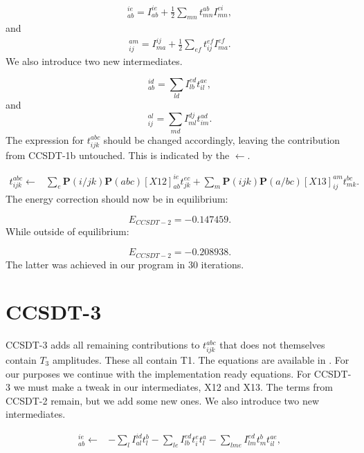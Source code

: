 \begin{align}
[X1]_{ab}^{ie} = I_{ab}^{ie} +
\frac{1}{2} \sum_{mn} t_{mn}^{ab} I_{mn}^{ei} ,
\end{align}
and
\begin{align}
[X2]_{ij}^{am} = I_{ma}^{ij} + \frac{1}{2} \sum_{ef} t_{ij}^{ef} I_{ma}^{ef}  .
\end{align}
We also introduce two new intermediates.

\begin{equation}
[X12]_{ab}^{id} = \sum_{ld} I_{lb}^{ed} t_{il}^{ae} ,
\end{equation}
and
\begin{equation}
[X13]_{ij}^{al} = \sum_{md} I_{ml}^{dj} t^{ad}_{im} .
\end{equation}
The expression for $t_{ijk}^{abc}$ should be changed accordingly, leaving the contribution from CCSDT-1b untouched. This is indicated by the $\leftarrow$. 

\begin{align}
t_{ijk}^{abc} \leftarrow &
\sum_e \textbf{P}(i/jk) \textbf{P}(abc) [X12]_{ab}^{ie} t_{jk}^{ec}
+ \sum_m \textbf{P} (ijk) \textbf{P}(a/bc) [X13]_{ij}^{am} t_{mk}^{bc} .
\end{align}
The energy correction should now be in equilibrium:

\begin{equation}
E_{CCSDT-2} = -0.147459 .
\end{equation}
While outside of equilibrium:

\begin{equation}
E_{CCSDT-2} = -0.208938 .
\end{equation}
The latter was achieved in our program in 30 iterations.

\section{CCSDT-3}
CCSDT-3 adds all remaining contributions to $t_{ijk}^{abc}$ that does not themselves contain $T_3$ amplitudes. These  all contain T1. The equations are available in \cite{CCSDT-ref4}. For our purposes we continue with the implementation ready equations. For CCSDT-3 we must make a tweak in our intermediates, X12 and X13. The terms from CCSDT-2 remain, but we add some new ones. We also introduce two new intermediates.

\begin{align}
[X12]_{ab}^{ie} \leftarrow  & - \sum_l I_{al}^{id} t_l^b - \sum_{le} I_{lb}^{ed} t_i^e t_l^a - \sum_{lme} I_{lm}^{ed} t_m^b t_{il}^{ae} ,
\end{align}

